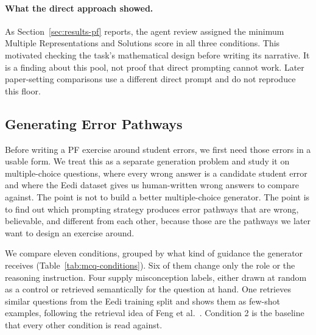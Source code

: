 \paragraph{What the direct approach showed.} As Section~\ref{sec:results-pf} reports, the agent review assigned the minimum Multiple Representations and Solutions score in all three conditions. This motivated checking the task's mathematical design before writing its narrative. It is a finding about this pool, not proof that direct prompting cannot work. Later paper-setting comparisons use a different direct prompt and do not reproduce this floor.

\subsection{Generating Error Pathways}

Before writing a PF exercise around student errors, we first need those errors in a usable form. We treat this as a separate generation problem and study it on multiple-choice questions, where every wrong answer is a candidate student error and where the Eedi dataset gives us human-written wrong answers to compare against. The point is not to build a better multiple-choice generator. The point is to find out which prompting strategy produces error pathways that are wrong, believable, and different from each other, because those are the pathways we later want to design an exercise around.

We compare eleven conditions, grouped by what kind of guidance the generator receives (Table~\ref{tab:mcq-conditions}). Six of them change only the role or the reasoning instruction. Four supply misconception labels, either drawn at random as a control or retrieved semantically for the question at hand. One retrieves similar questions from the Eedi training split and shows them as few-shot examples, following the retrieval idea of Feng et al.~\cite{feng2024}. Condition 2 is the baseline that every other condition is read against.

